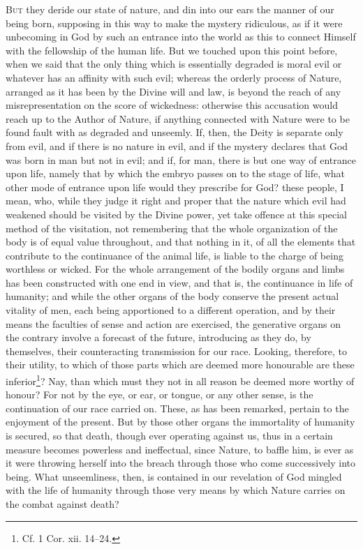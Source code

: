 
\textsc{But} they deride our state of nature, and din into our ears the manner of our being born, supposing in this way to make the mystery ridiculous, as if it were unbecoming in God by such an entrance into the world as this to connect Himself with the fellowship of the human life. But we touched upon this point before, when we said that the only thing which is essentially degraded is moral evil or whatever has an affinity with such evil; whereas the orderly process of Nature, arranged as it has been by the Divine will and law, is beyond the reach of any misrepresentation on the score of wickedness: otherwise this accusation would reach up to the Author of Nature, if anything connected with Nature were to be found fault with as degraded and unseemly. If, then, the Deity is separate only from evil, and if there is no nature in evil, and if the mystery declares that God was born in man but not in evil; and if, for man, there is but one way of entrance upon life, namely that by which the embryo passes on to the stage of life, what other mode of entrance upon life would they prescribe for God? these people, I mean, who, while they judge it right and proper that the nature which evil had weakened should be visited by the Divine power, yet take offence at this special method of the visitation, not remembering that the whole organization of the body is of equal value throughout, and that nothing in it, of all the elements that contribute to the continuance of the animal life, is liable to the charge of being worthless or wicked. For the whole arrangement of the bodily organs and limbs has been constructed with one end in view, and that is, the continuance in life of humanity; and while the other organs of the body conserve the present actual vitality of men, each being apportioned to a different operation, and by their means the faculties of sense and action are exercised, the generative organs on the contrary involve a forecast of the future, introducing as they do, by themselves, their counteracting transmission for our race. Looking, therefore, to their utility, to which of those parts which are deemed more honourable are these inferior\footnote{Cf. 1 Cor. xii. 14–24.}? Nay, than which must they not in all reason be deemed more worthy of honour? For not by the eye, or ear, or tongue, or any other sense, is the continuation of our race carried on. These, as has been remarked, pertain to the enjoyment of the present. But by those other organs the immortality of humanity is secured, so that death, though ever operating against us, thus in a certain measure becomes powerless and ineffectual, since Nature, to baffle him, is ever as it were throwing herself into the breach through those who come successively into being. What unseemliness, then, is contained in our revelation of God mingled with the life of humanity through those very means by which Nature carries on the combat against death?

